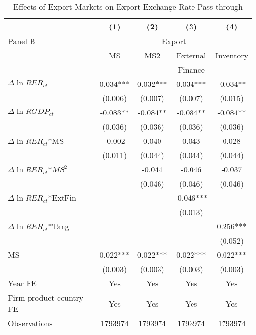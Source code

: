 \begin{table}[htbp]
	\centering
	\caption{Effects of Export Markets on Export Exchange Rate Pass-through}
	\begin{tabular}{lcccc}
		\toprule
		& (1)   & (2)   & (3)   & (4) \\
		\midrule
		Panel B & \multicolumn{4}{c}{Export} \\
		& MS    & MS\^2 & External & Inventory \\
		&       &       & Finance &  \\
		\midrule
		$\Delta \ln RER_{ct}$ & 0.034*** & 0.032*** & 0.034*** & -0.034** \\
		& (0.006) & (0.007) & (0.007) & (0.015) \\
		$\Delta \ln RGDP_{ct}$ & -0.083** & -0.084** & -0.084** & -0.084** \\
		& (0.036) & (0.036) & (0.036) & (0.036) \\
		$\Delta \ln RER_{ct}$*MS & -0.002 & 0.040 & 0.043 & 0.028 \\
		& (0.011) & (0.044) & (0.044) & (0.044) \\
		$\Delta \ln RER_{ct}$*$MS^2$ &       & -0.044 & -0.046 & -0.037 \\
		&       & (0.046) & (0.046) & (0.046) \\
		$\Delta \ln RER_{ct}$*ExtFin &       &       & -0.046*** &  \\
		&       &       & (0.013) &  \\
		$\Delta \ln RER_{ct}$*Tang &       &       &       & 0.256*** \\
		&       &       &       & (0.052) \\
		MS    & 0.022*** & 0.022*** & 0.022*** & 0.022*** \\
		& (0.003) & (0.003) & (0.003) & (0.003) \\
		Year FE  & Yes   & Yes   & Yes   & Yes \\
		Firm-product-country FE & Yes   & Yes   & Yes   & Yes \\
		Observations & 1793974 & 1793974 & 1793974 & 1793974 \\
		\bottomrule
	    \end{tabular}
	\label{tabA.3}
\end{table}

